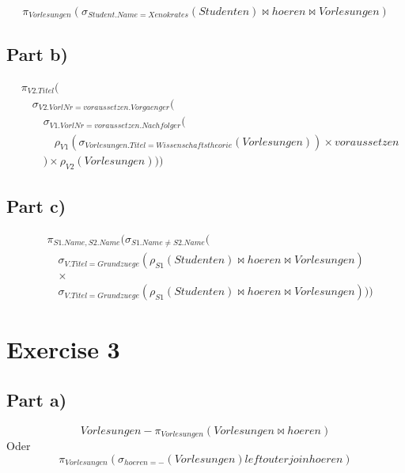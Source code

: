 \documentclass[10pt,a4paper]{article}
\begin{document}
\begin{equation*}
  \pi_{Vorlesungen}(\sigma_{Student.Name = Xenokrates}(Studenten) \bowtie hoeren \bowtie Vorlesungen)
\end{equation*}

\subsection*{Part b)}

\begin{align*}
  & \pi_{V2.Titel}(\\
  & \quad \sigma_{V2.VorlNr = voraussetzen.Vorgaenger}(\\
  & \quad \quad \sigma_{V1.VorlNr = voraussetzen.Nachfolger}(\\
  & \quad \quad \quad \rho_{V1}(\sigma_{Vorlesungen.Titel = Wissenschaftstheorie}(Vorlesungen)) \times voraussetzen\\
  & \quad \quad ) \times \rho_{V2}(Vorlesungen)))
\end{align*}

\subsection*{Part c)}

\begin{align*}
  & \pi_{S1.Name, S2.Name}(\sigma_{S1.Name \ne S2.Name}(\\
  & \quad \sigma_{V.Titel = Grundzuege}(\rho_{S1}(Studenten) \bowtie hoeren \bowtie Vorlesungen)\\
  & \quad \times\\
  & \quad \sigma_{V.Titel = Grundzuege}(\rho_{S1}(Studenten) \bowtie hoeren \bowtie Vorlesungen)))
\end{align*}

\section*{Exercise 3}

\subsection*{Part a)}

\begin{equation*}
  Vorlesungen - \pi_{Vorlesungen}(Vorlesungen \bowtie hoeren)
\end{equation*}
Oder
\begin{equation*}
  \pi_{Vorlesungen}(\sigma_{hoeren = -}(Vorlesungen) left outer join hoeren)
\end{equation*}
\end{document}
